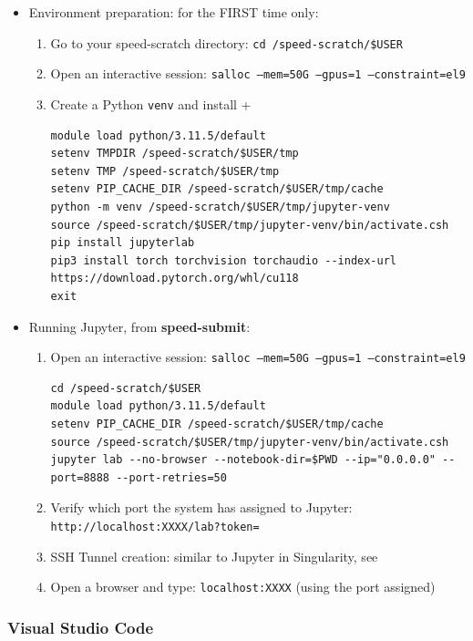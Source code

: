 \begin{itemize}
\item Environment preparation: for the FIRST time only:
\begin{enumerate}
\item Go to your speed-scratch directory: \texttt{cd /speed-scratch/\$USER}
\item Open an interactive session: \texttt{salloc --mem=50G --gpus=1 --constraint=el9}
\item Create a Python \texttt{venv} and install +
\small
\begin{verbatim}
module load python/3.11.5/default
setenv TMPDIR /speed-scratch/$USER/tmp
setenv TMP /speed-scratch/$USER/tmp
setenv PIP_CACHE_DIR /speed-scratch/$USER/tmp/cache
python -m venv /speed-scratch/$USER/tmp/jupyter-venv
source /speed-scratch/$USER/tmp/jupyter-venv/bin/activate.csh
pip install jupyterlab
pip3 install torch torchvision torchaudio --index-url https://download.pytorch.org/whl/cu118
exit
\end{verbatim}
\normalsize
\end{enumerate}

\item Running Jupyter, from \textbf{speed-submit}:
\begin{enumerate}
\item Open an interactive session: \texttt{salloc --mem=50G --gpus=1 --constraint=el9}
\small
\begin{verbatim}
cd /speed-scratch/$USER
module load python/3.11.5/default
setenv PIP_CACHE_DIR /speed-scratch/$USER/tmp/cache
source /speed-scratch/$USER/tmp/jupyter-venv/bin/activate.csh
jupyter lab --no-browser --notebook-dir=$PWD --ip="0.0.0.0" --port=8888 --port-retries=50
\end{verbatim}
\normalsize

\item Verify which port the system has assigned to Jupyter: \texttt{http://localhost:XXXX/lab?token=}

\item SSH Tunnel creation: similar to Jupyter in Singularity, see 

\item Open a browser and type: \texttt {localhost:XXXX} (using the port assigned)
\end{enumerate}
\end{itemize}


\subsubsection{Visual Studio Code}
\label{sect:vscode}

